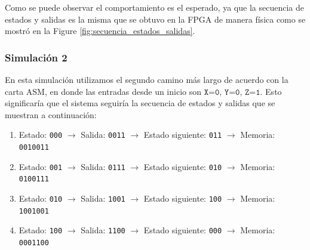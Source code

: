 \documentclass[12pt, letterpaper]{article}
\begin{document}
Como se puede observar el comportamiento es el esperado, ya que la secuencia de estados y salidas es la misma que se obtuvo en la FPGA de manera física como se mostró en la Figure \ref{fig:secuencia_estados_salidas}.

\subsubsection*{Simulación 2}

En esta simulación utilizamos el segundo camino más largo de acuerdo con la carta ASM, en donde las entradas desde un inicio son \(\texttt{X=0, Y=0, Z=1}\). Esto significaría que el sistema seguiría la secuencia de estados y salidas que se muestran a continuación:

\begin{enumerate}
    \item[\textcolor{NavyBlue}{sec-1:}] Estado: \texttt{000} \(\rightarrow\) Salida: \texttt{0011} \(\rightarrow\) Estado siguiente: \texttt{011} \(\rightarrow\) Memoria: \texttt{0010011}
    \item[\textcolor{NavyBlue}{sec-2:}] Estado: \texttt{001} \(\rightarrow\) Salida: \texttt{0111} \(\rightarrow\) Estado siguiente: \texttt{010} \(\rightarrow\) Memoria: \texttt{0100111}
    \item[\textcolor{NavyBlue}{sec-3:}] Estado: \texttt{010} \(\rightarrow\) Salida: \texttt{1001} \(\rightarrow\) Estado siguiente: \texttt{100} \(\rightarrow\) Memoria: \texttt{1001001}
    \item[\textcolor{NavyBlue}{sec-4:}] Estado: \texttt{100} \(\rightarrow\) Salida: \texttt{1100} \(\rightarrow\) Estado siguiente: \texttt{000} \(\rightarrow\) Memoria: \texttt{0001100}
\end{enumerate}
\end{document}
